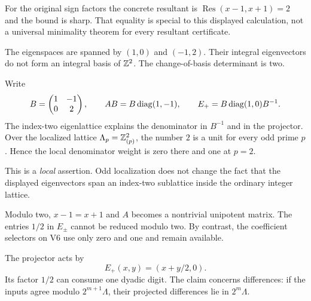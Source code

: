 For the original sign factors the concrete resultant is $\operatorname{Res}(x-1,x+1)=2$ and the bound is sharp. That equality is special to this displayed calculation, not a universal minimality theorem for every resultant certificate.


The eigenspaces are spanned by $(1,0)$ and $(-1,2)$. Their integral eigenvectors do not form an integral basis of $\mathbb Z^2$. The change-of-basis determinant is two.


Write
\[
B=\begin{pmatrix}1&-1\\0&2\end{pmatrix},\qquad
AB=B\operatorname{diag}(1,-1),\qquad
E_+=B\operatorname{diag}(1,0)B^{-1}.
\]
The index-two eigenlattice explains the denominator in $B^{-1}$ and in the projector. Over the localized lattice $\Lambda_p=\mathbb Z_{(p)}^2$, the number $2$ is a unit for every odd prime $p$. Hence the local denominator weight is zero there and one at $p=2$.

This is a \emph{local} assertion. Odd localization does not change the fact that the displayed eigenvectors span an index-two sublattice inside the ordinary integer lattice.

Modulo two, $x-1=x+1$ and $A$ becomes a nontrivial unipotent matrix. The entries $1/2$ in $E_\pm$ cannot be reduced modulo two. By contrast, the coefficient selectors on V6 use only zero and one and remain available.


The projector acts by
\[
E_+(x,y)=(x+y/2,0).
\]
Its factor $1/2$ can consume one dyadic digit. The claim concerns differences: if the inputs agree modulo $2^{m+1}\Lambda$, their projected differences lie in $2^m\Lambda$.

